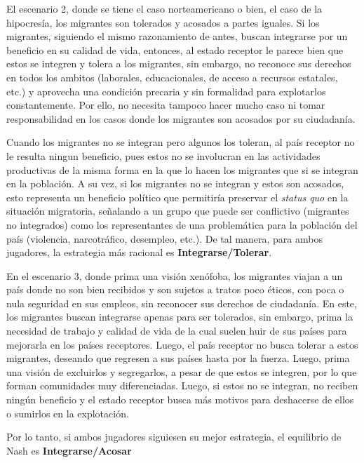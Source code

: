 \documentclass{homework}
\begin{document}
El escenario 2, donde se tiene el caso norteamericano o bien, el caso de la hipocresía, los migrantes son tolerados y acosados a partes iguales. Si los migrantes, siguiendo el mismo razonamiento de antes, buscan integrarse por un beneficio en su calidad de vida, entonces, al estado receptor le parece bien que estos se integren y tolera a los migrantes, sin embargo, no reconoce sus derechos en todos los ambitos (laborales, educacionales, de acceso a recursos estatales, etc.) y aprovecha una condición precaria y sin formalidad para explotarlos constantemente. Por ello, no necesita tampoco hacer mucho caso ni tomar responsabilidad en los casos donde los migrantes son acosados por su ciudadanía. \newline

Cuando los migrantes no se integran pero algunos los toleran, al país receptor no le resulta ningun beneficio, pues estos no se involucran en las actividades productivas de la misma forma en la que lo hacen los migrantes que si se integran en la población. A su vez, si los migrantes no se integran y estos son acosados, esto representa un beneficio político que permitiría preservar el \textit{status quo} en la situación migratoria, señalando a un grupo que puede ser conflictivo (migrantes no integrados) como los representantes de una problemática para la población del país (violencia, narcotráfico, desempleo, etc.). De tal manera, para ambos jugadores, la estrategia más racional es \textbf{Integrarse/Tolerar}.\newline

En el escenario 3, donde prima una visión xenófoba, los migrantes viajan a un país donde no son bien recibidos y son sujetos a tratos poco éticos, con poca o nula seguridad en sus empleos, sin reconocer sus derechos de ciudadanía. En este, los migrantes buscan integrarse apenas para ser tolerados, sin embargo, prima la necesidad de trabajo y calidad de vida de la cual suelen huir de sus países para mejorarla en los países receptores. Luego, el país receptor no busca tolerar a estos migrantes, deseando que regresen a sus países hasta por la fuerza. Luego, prima una visión de excluirlos y segregarlos, a pesar de que estos se integren, por lo que forman comunidades muy diferenciadas. Luego, si estos no se integran, no reciben ningún beneficio y el estado receptor busca más motivos para deshacerse de ellos o sumirlos en la explotación. \newline

Por lo tanto, si ambos jugadores siguiesen su mejor estrategia, el equilibrio de Nash es \textbf{Integrarse/Acosar} \newline
\end{document}
